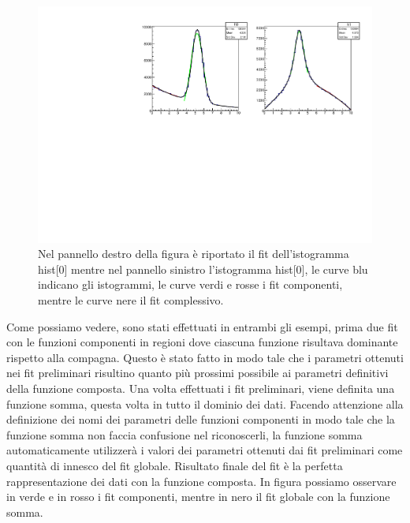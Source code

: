 \documentclass[11pt,fleqn]{book} %
\begin{document}
\begin{figure}[h]
\centering
\includegraphics[scale=0.7]{Pictures/fitdoppi.pdf}
\caption{Nel pannello destro della figura è riportato il fit dell'istogramma hist[0] mentre nel pannello sinistro l'istogramma  hist[0], le curve blu indicano gli istogrammi, le curve verdi e rosse i fit componenti, mentre le curve nere il fit complessivo. \label{fitbabbo5}}
\end{figure}

Come possiamo vedere, sono stati effettuati in entrambi gli esempi, prima due fit con le funzioni componenti in regioni dove ciascuna funzione risultava dominante rispetto alla compagna. Questo è stato fatto in modo tale che i parametri ottenuti nei fit preliminari risultino quanto più prossimi possibile ai parametri definitivi della funzione composta. Una volta effettuati i fit preliminari, viene definita una funzione somma, questa volta in tutto il dominio dei dati. Facendo attenzione alla definizione dei nomi dei parametri delle funzioni componenti in modo tale che la funzione somma non faccia confusione nel riconoscerli, la funzione somma automaticamente  utilizzerà i valori dei parametri ottenuti dai fit preliminari come quantità di innesco del fit globale. Risultato finale del fit è la perfetta rappresentazione dei dati con la funzione composta.
In figura possiamo osservare in verde e in rosso i fit componenti, mentre in nero il fit globale con la funzione somma.
\end{document}
